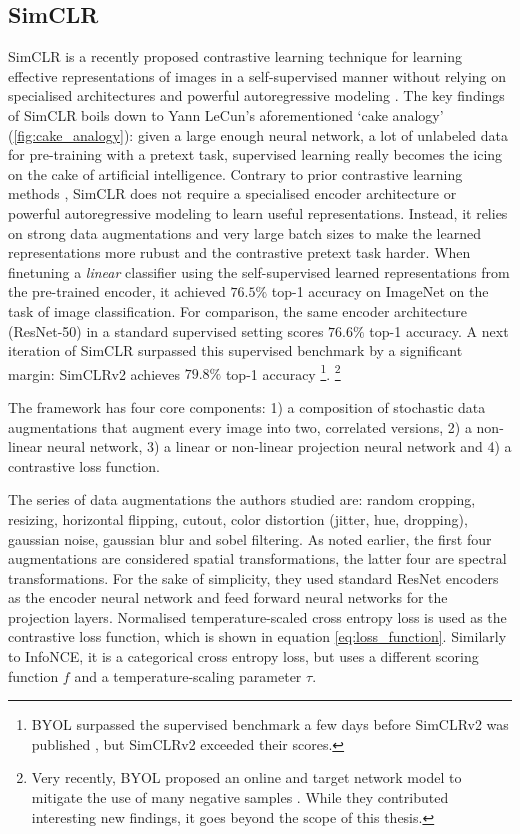 \subsection{SimCLR}
SimCLR is a recently proposed contrastive learning technique for learning effective representations of images in a self-supervised manner without relying on specialised architectures and powerful autoregressive modeling \cite{chen_simple_2020}.
The key findings of SimCLR boils down to Yann LeCun's aforementioned `cake analogy' (\ref{fig:cake_analogy}): given a large enough neural network, a lot of unlabeled data for pre-training with a pretext task, supervised learning really becomes the icing on the cake of artificial intelligence.
Contrary to prior contrastive learning methods \cite{oord_representation_2019,henaff2019data,hjelm_learning_2019}, SimCLR does not require a specialised encoder architecture or powerful autoregressive modeling to learn useful representations. Instead, it relies on strong data augmentations and very large batch sizes to make the learned representations more rubust and the contrastive pretext task harder.
When finetuning a \textit{linear} classifier using the self-supervised learned representations from the pre-trained encoder, it achieved $76.5\%$ top-1 accuracy on ImageNet on the task of image classification.
For comparison, the same encoder architecture (ResNet-50) in a standard supervised setting scores $76.6\%$ top-1 accuracy.
A next iteration of SimCLR surpassed this supervised benchmark by a significant margin: SimCLRv2 achieves $79.8\%$ top-1 accuracy \cite{chen2020big}\footnote{BYOL surpassed the supervised benchmark a few days before SimCLRv2 was published \cite{Grill2020BootstrapYO}, but SimCLRv2 exceeded their scores.}.
\footnote{Very recently, BYOL proposed an online and target network model to mitigate the use of many negative samples \cite{Grill2020BootstrapYO}.
While they contributed interesting new findings, it goes beyond the scope of this thesis.}

The framework has four core components: 1) a composition of stochastic data augmentations that augment every image into two, correlated versions, 2) a non-linear neural network, 3) a linear or non-linear projection neural network and 4) a contrastive loss function.

The series of data augmentations the authors studied are: random cropping, resizing, horizontal flipping, cutout, color distortion (jitter, hue, dropping), gaussian noise, gaussian blur and sobel filtering. As noted earlier, the first four augmentations are considered spatial transformations, the latter four are spectral transformations.
For the sake of simplicity, they used standard ResNet encoders as the encoder neural network and feed forward neural networks for the projection layers.
Normalised temperature-scaled cross entropy loss is used as the contrastive loss function, which is shown in equation \ref{eq:loss_function}. Similarly to InfoNCE, it is a categorical cross entropy loss, but uses a different scoring function $f$ and a temperature-scaling parameter $\tau$.


